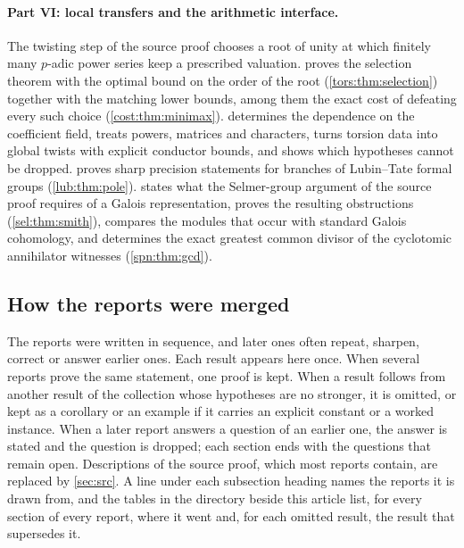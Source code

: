 \paragraph{Part VI: local transfers and the arithmetic interface.}
The twisting step of the source proof chooses a root of unity at which finitely many $p$-adic
power series keep a prescribed valuation.  proves the selection theorem with
the optimal bound on the order of the root (\cref{tors:thm:selection}) together with the
matching lower bounds, among them the exact cost of defeating every such choice
(\cref{cost:thm:minimax}).  determines the dependence on the coefficient field,
treats powers, matrices and characters, turns torsion data into global twists with explicit
conductor bounds, and shows which hypotheses cannot be dropped.  proves sharp
precision statements for branches of Lubin--Tate formal groups (\cref{lub:thm:pole}).
 states what the Selmer-group argument of the source proof requires of a Galois
representation, proves the resulting obstructions (\cref{sel:thm:smith}), compares the
modules that occur with standard Galois cohomology, and determines the exact greatest common
divisor of the cyclotomic annihilator witnesses (\cref{spn:thm:gcd}).

\subsection{How the reports were merged}

The reports were written in sequence, and later ones often repeat, sharpen, correct or
answer earlier ones. Each result appears here once. When several reports prove the same
statement, one proof is kept. When a result follows from another result of the collection
whose hypotheses are no stronger, it is omitted, or kept as a corollary or an example if it
carries an explicit constant or a worked instance. When a later report answers a question
of an earlier one, the answer is stated and the question is dropped; each section ends with
the questions that remain open. Descriptions of the source proof, which most reports
contain, are replaced by \cref{sec:src}. A line under each subsection heading names the
reports it is drawn from, and the tables in the directory  beside this
article list, for every section of every report, where it went and, for each omitted
result, the result that supersedes it.
